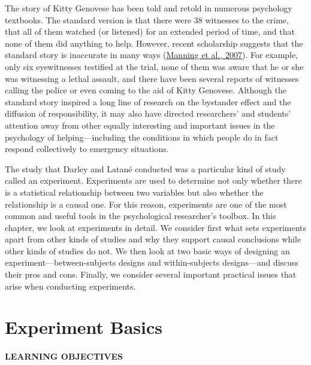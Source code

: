 \documentclass[
]{krantz}
\begin{document}
The story of Kitty Genovese has been told and retold in numerous psychology textbooks. The standard version is that there were 38 witnesses to the crime, that all of them watched (or listened) for an extended period of time, and that none of them did anything to help. However, recent scholarship suggests that the standard story is inaccurate in many ways (\protect\hyperlink{ref-manning2007kitty}{Manning et al., 2007}). For example, only six eyewitnesses testified at the trial, none of them was aware that he or she was witnessing a lethal assault, and there have been several reports of witnesses calling the police or even coming to the aid of Kitty Genovese. Although the standard story inspired a long line of research on the bystander effect and the diffusion of responsibility, it may also have directed researchers' and students' attention away from other equally interesting and important issues in the psychology of helping---including the conditions in which people do in fact respond collectively to emergency situations.

The study that Darley and Latané conducted was a particular kind of study called an experiment. Experiments are used to determine not only whether there is a statistical relationship between two variables but also whether the relationship is a causal one. For this reason, experiments are one of the most common and useful tools in the psychological researcher's toolbox. In this chapter, we look at experiments in detail. We consider first what sets experiments apart from other kinds of studies and why they support causal conclusions while other kinds of studies do not. We then look at two basic ways of designing an experiment---between-subjects designs and within-subjects designs---and discuss their pros and cons. Finally, we consider several important practical issues that arise when conducting experiments.

\hypertarget{experiment-basics}{%
\section{Experiment Basics}\label{experiment-basics}}

\hypertarget{learning-objectives-12}{%
\paragraph*{LEARNING OBJECTIVES}\label{learning-objectives-12}}
\end{document}
